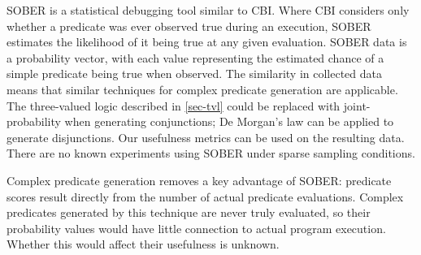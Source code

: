 SOBER \cite{1081753} is a statistical debugging tool similar to CBI.  Where CBI considers only whether a predicate was ever observed true during an execution, SOBER estimates the likelihood of it being true at any given evaluation.  SOBER data is a probability vector, with each value representing the estimated chance of a simple predicate being true when observed.  The similarity in collected data means that similar techniques for complex predicate generation are applicable.  The three-valued logic described in \autoref{sec-tvl} could be replaced with joint-probability when generating conjunctions; De Morgan's law can be applied to generate disjunctions.  Our usefulness metrics can be used on the resulting data.  There are no known experiments using SOBER under sparse sampling conditions.

Complex predicate generation removes a key advantage of SOBER: predicate scores result directly from the number of actual predicate evaluations.  Complex predicates generated by this technique are never truly evaluated, so their probability values would have little connection to actual program execution.  Whether this would affect their usefulness is unknown.
